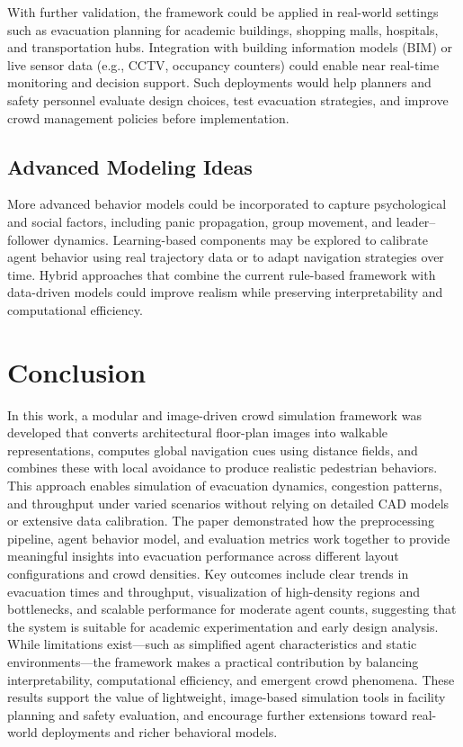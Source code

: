 \documentclass[conference]{IEEEtran}
\begin{document}
With further validation, the framework could be applied in real-world settings
such as evacuation planning for academic buildings, shopping malls, hospitals,
and transportation hubs. Integration with building information models (BIM) or
live sensor data (e.g., CCTV, occupancy counters) could enable near real-time
monitoring and decision support. Such deployments would help planners and
safety personnel evaluate design choices, test evacuation strategies, and
improve crowd management policies before implementation.

\subsection{\textbf{Advanced Modeling Ideas}}

More advanced behavior models could be incorporated to capture psychological
and social factors, including panic propagation, group movement, and
leader–follower dynamics. Learning-based components may be explored to
calibrate agent behavior using real trajectory data or to adapt navigation
strategies over time. Hybrid approaches that combine the current rule-based
framework with data-driven models could improve realism while preserving
interpretability and computational efficiency.

\section{Conclusion}

In this work, a modular and image-driven crowd simulation framework was
developed that converts architectural floor-plan images into walkable
representations, computes global navigation cues using distance fields, and
combines these with local avoidance to produce realistic pedestrian behaviors.
This approach enables simulation of evacuation dynamics, congestion patterns,
and throughput under varied scenarios without relying on detailed CAD models or
extensive data calibration. The paper demonstrated how the preprocessing
pipeline, agent behavior model, and evaluation metrics work together to provide
meaningful insights into evacuation performance across different layout
configurations and crowd densities. Key outcomes include clear trends in
evacuation times and throughput, visualization of high-density regions and
bottlenecks, and scalable performance for moderate agent counts, suggesting
that the system is suitable for academic experimentation and early design
analysis. While limitations exist—such as simplified agent characteristics and
static environments—the framework makes a practical contribution by balancing
interpretability, computational efficiency, and emergent crowd phenomena. These
results support the value of lightweight, image-based simulation tools in
facility planning and safety evaluation, and encourage further extensions
toward real-world deployments and richer behavioral models.
\end{document}
